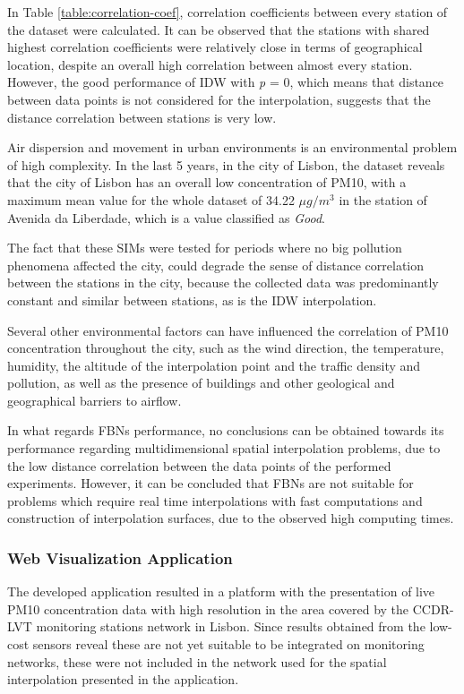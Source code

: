 In Table \ref{table:correlation-coef}, correlation coefficients between every station of the dataset were calculated. It can be observed that the stations with shared highest correlation coefficients were relatively close in terms of geographical location, despite an overall high correlation between almost every station. However, the good performance of IDW with \textit{p} = 0, which means that distance between data points is not considered for the interpolation, suggests that the distance correlation between stations is very low.

Air dispersion and movement in urban environments is an environmental problem of high complexity. In the last 5 years, in the city of Lisbon, the dataset reveals that the city of Lisbon has an overall low concentration of PM10, with a maximum mean value for the whole dataset of 34.22 $\mu g/m^3$ in the station of Avenida da Liberdade, which is a value classified as \textit{Good}.

The fact that these SIMs were tested for periods where no big pollution phenomena affected the city, could degrade the sense of distance correlation between the stations in the city, because the collected data was predominantly constant and similar between stations, as is the IDW interpolation.

Several other environmental factors can have influenced the correlation of PM10 concentration throughout the city, such as the wind direction, the temperature, humidity, the altitude of the interpolation point and the traffic density and pollution, as well as the presence of buildings and other geological and geographical barriers to airflow.

In what regards FBNs performance, no conclusions can be obtained towards its performance regarding multidimensional spatial interpolation problems, due to the low distance correlation between the data points of the performed experiments. However, it can be concluded that FBNs are not suitable for problems which require real time interpolations with fast computations and construction of interpolation surfaces, due to the observed high computing times.

\subsubsection{Web Visualization Application}

The developed application resulted in a platform with the presentation of live PM10 concentration data with high resolution in the area covered by the CCDR-LVT monitoring stations network in Lisbon. Since results obtained from the low-cost sensors reveal these are not yet suitable to be integrated on monitoring networks, these were not included in the network used for the spatial interpolation presented in the application.

